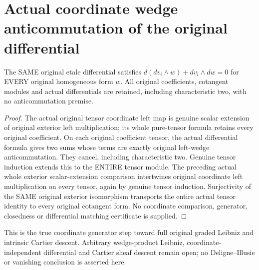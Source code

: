 \section{Actual coordinate wedge anticommutation of the original differential}
\label{sec:etale-differential-coordinate-wedge}

\begin{theorem}
\label{lem:cartier-etale-coordinate-wedge-anticommutation}
\leanok
The SAME original etale differential satisfies
$d(dv_i\wedge w)+dv_i\wedge dw=0$ for EVERY original homogeneous form $w$.
All original coefficients, cotangent modules and actual differentials are
retained, including characteristic two, with no anticommutation premise.
\end{theorem}
\begin{proof}
The actual original tensor coordinate left map is genuine scalar extension
of original exterior left multiplication; its whole pure-tensor formula
retains every original coefficient. On each original coefficient tensor,
the actual differential formula gives two sums whose terms are exactly
original left-wedge anticommutation. They cancel, including characteristic
two. Genuine tensor induction extends this to the ENTIRE tensor module.
The preceding actual whole exterior scalar-extension comparison intertwines
original coordinate left multiplication on every tensor, again by genuine
tensor induction. Surjectivity of the SAME original exterior isomorphism
transports the entire actual tensor identity to every original cotangent
form. No coordinate comparison, generator, closedness or differential
matching certificate is supplied.
\end{proof}

This is the true coordinate generator step toward full original graded
Leibniz and intrinsic Cartier descent. Arbitrary wedge-product Leibniz,
coordinate-independent differential and Cartier sheaf descent remain open;
no Deligne--Illusie or vanishing conclusion is asserted here.
